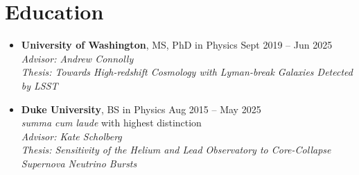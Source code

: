 \section{Education}

\begin{itemize}[itemsep=0.5em]
    \item \textbf{University of Washington}, MS, PhD in Physics
    \hfill Sept 2019 -- Jun 2025 \\
    \textit{Advisor: Andrew Connolly} \\
    \textit{Thesis: Towards High-redshift Cosmology with Lyman-break Galaxies Detected by LSST}

    \item \textbf{Duke University}, BS in Physics
    \hfill Aug 2015 -- May 2025 \\
    \textit{summa cum laude} with highest distinction \\
    \textit{Advisor: Kate Scholberg} \\
    \textit{Thesis: Sensitivity of the Helium and Lead Observatory to Core-Collapse Supernova Neutrino Bursts}
\end{itemize}